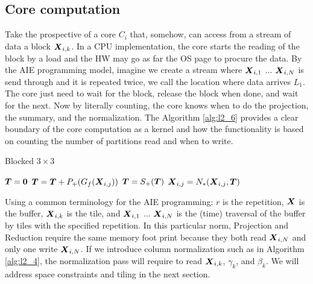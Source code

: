 \documentclass[acmsmall]{acmart}
\begin{document}
\subsection{Core computation}
Take the prospective of a core $C_i$ that, somehow, can access from a
stream of data a block ${\boldsymbol X_{i,k}}$. In a CPU implementation, the
core starts the reading of the block by a load and the HW may go as
far the OS page to procure the data. By the AIE programming model,
imagine we create a stream where ${\boldsymbol X_{i,1}}$ ... ${\boldsymbol X_{i,N}}$ is
send through and it is repeated twice, we call the location where data
arrives $L_1$.  The core just need to wait for the block, release the
block when done, and wait for the next. Now by literally counting, the
core knows when to do the projection, the summary, and the
normalization. The Algorithm \ref{alg:l2_6} provides a clear boundary
of the core computation as a kernel and how the functionality is based
on counting the number of partitions read and when to write.


{\small \begin{algorithm}
    \caption{Blocked $3\times 3$}
    \label{alg:l2_6}
    \begin{algorithmic}
          \STATE ${\boldsymbol T} = {\boldsymbol 0} $  
             \STATE {} 
             \STATE ${\boldsymbol T} = {\boldsymbol T} +P_+(G_{f}({\boldsymbol X}_{i,j}))$  
             \STATE ${\boldsymbol T}  =   S_+({\boldsymbol T})$      
             \ELSE
             \STATE $ {\boldsymbol X}_{i,j} = N_*({\boldsymbol X}_{i,j},{\boldsymbol T})$
             \ENDIF
         \ENDWHILE
      \ENDWHILE
    \end{algorithmic}
\end{algorithm} }

Using a common terminology for the AIE programming: $r$ is the
repetition, ${\boldsymbol X}$ is the buffer, ${\boldsymbol X}_{i,k}$ is the tile, and
${\boldsymbol X_{i,1}}$ ... ${\boldsymbol X_{i,N}}$ is the (time) traversal of the
buffer by tiles with the specified repetition. In this particular
norm, Projection and Reduction require the same memory foot print
because they both read ${\boldsymbol X_{i,N}}$ and only one write
${\boldsymbol X_{i,N}}$. If we introduce column normalization such as in
Algorithm \ref{alg:l2_4}, the normalization pass will require to read
${\boldsymbol X_{i,k}}$, $\gamma_k$, and $\beta_k$. We will address space
constraints and tiling in the next section.
\end{document}
